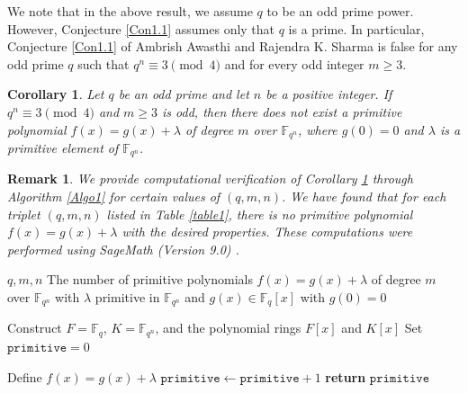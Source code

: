 \documentclass[preprint,12pt]{elsarticle}
\newtheorem{cor}{Corollary}[section]
\newtheorem{rk}{Remark}[section]
\begin{document}
        We note that in the above result, we assume $q$ to be an odd prime power. However, Conjecture \ref{Con1.1} assumes only that $q$ is a prime. In particular, {\upshape Conjecture \ref{Con1.1}} of Ambrish Awasthi and Rajendra K. Sharma is false for any odd prime $q$ such that $q^n\equiv 3 \pmod 4$ and for every odd integer $m\geq 3$.

    \begin{cor}\label{Cor2.2}
        Let $q$ be an odd prime and let $n$ be a positive integer. If $q^n\equiv3\pmod{4}$ and $m\geq 3$ is odd, then there does not exist a primitive polynomial $f(x)=g(x)+\lambda$ of degree $m$ over $\mathbb{F}_{q^n}$, where $g(0)=0$ and $\lambda$ is a primitive element of $\mathbb{F}_{q^n}$.
    \end{cor}

    \begin{rk}\label{R2.1}
         We provide computational verification of {\upshape Corollary \ref{Cor2.2}} through {\upshape Algorithm \ref{Algo1}} for certain values of $(q,m,n)$. We have found that for each triplet $(q,m,n)$ listed in {\upshape Table \ref{table1}}, there is no primitive polynomial $f(x)=g(x)+\lambda$ with the desired properties. These computations were performed using {\upshape SageMath (Version 9.0) \cite{sagemath}}.

    \end{rk}

    \begin{algorithm}[h!]
    \caption{Exhaustive Search for Primitive Polynomials $f(x)=g(x)+\lambda$ over $\mathbb{F}_{q^n}$ with Primitive $\lambda\in\mathbb{F}_{q^n}$}
    \label{Algo1}
    \begin{algorithmic}[1]
        \Require $q,m,n$
        \Ensure The number of primitive polynomials
        $f(x)=g(x)+\lambda$ of degree $m$
        over $\mathbb{F}_{q^n}$ with $\lambda$ primitive in $\mathbb{F}_{q^n}$ and $g(x)\in\mathbb{F}_q[x]$ with $g(0)=0$

        \State Construct $F=\mathbb{F}_{q}$, $K=\mathbb{F}_{q^n}$, and the polynomial rings $F[x]$ and $K[x]$
        \State Set $\texttt{primitive}=0$

                    \State Define
                    $f(x)=g(x)+\lambda$
                        \State $\texttt{primitive}\gets\texttt{primitive}+1$
                    \EndIf
                \EndFor
            \EndIf
        \EndFor
        \State \textbf{return} $\texttt{primitive}$
    \end{algorithmic}
\end{algorithm}
\end{document}
